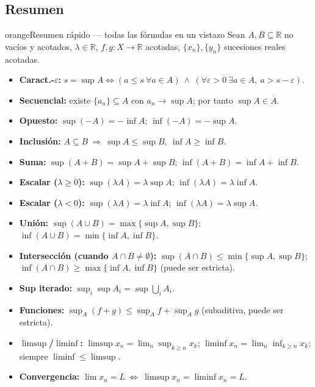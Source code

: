 \documentclass[11pt,twoside]{article}
\newcommand{\R}{\mathbb{R}}
\begin{document}
\subsection{Resumen}

\begin{equivbox}{orange}{Resumen rápido --- todas las fórmulas en un vistazo}
Sean \(A, B \subseteq \R\) no vacíos y acotados, \(\lambda \in \R\), \(f, g : X \to \R\) acotadas, \(\{x_{n}\}, \{y_{n}\}\) sucesiones reales acotadas.
\begin{itemize}[leftmargin=2em]
\item \textbf{Caract.-\(\varepsilon\):} \(s = \sup A \iff (a \leq s\ \forall a \in A)\ \land\ (\forall \varepsilon > 0\ \exists a \in A,\ a > s - \varepsilon)\).
\item \textbf{Secuencial:} existe \(\{a_{n}\} \subseteq A\) con \(a_{n} \to \sup A\); por tanto \(\sup A \in \overline{A}\).
\item \textbf{Opuesto:} \(\sup(-A) = -\inf A\); \(\inf(-A) = -\sup A\).
\item \textbf{Inclusión:} \(A \subseteq B\ \Rightarrow\ \sup A \leq \sup B,\ \inf A \geq \inf B\).
\item \textbf{Suma:} \(\sup(A + B) = \sup A + \sup B\); \(\inf(A + B) = \inf A + \inf B\).
\item \textbf{Escalar (\(\lambda \geq 0\)):} \(\sup(\lambda A) = \lambda \sup A\); \(\inf(\lambda A) = \lambda \inf A\).
\item \textbf{Escalar (\(\lambda < 0\)):} \(\sup(\lambda A) = \lambda \inf A\); \(\inf(\lambda A) = \lambda \sup A\).
\item \textbf{Unión:} \(\sup(A \cup B) = \max\{\sup A, \sup B\}\); \(\inf(A \cup B) = \min\{\inf A, \inf B\}\).
\item \textbf{Intersección (cuando \(A \cap B \neq \emptyset\)):} \(\sup(A \cap B) \leq \min\{\sup A, \sup B\}\); \(\inf(A \cap B) \geq \max\{\inf A, \inf B\}\) (puede ser estricta).
\item \textbf{Sup iterado:} \(\sup_{i} \sup A_{i} = \sup \bigcup_{i} A_{i}\).
\item \textbf{Funciones:} \(\sup_{A}(f + g) \leq \sup_{A} f + \sup_{A} g\) (subaditiva, puede ser estricta).
\item \textbf{\(\limsup\)/\(\liminf\):} \(\limsup x_{n} = \lim_{n} \sup_{k \geq n} x_{k}\); \(\liminf x_{n} = \lim_{n} \inf_{k \geq n} x_{k}\); siempre \(\liminf \leq \limsup\).
\item \textbf{Convergencia:} \(\lim x_{n} = L\ \iff\ \limsup x_{n} = \liminf x_{n} = L\).
\end{itemize}
\end{equivbox}
\end{document}
